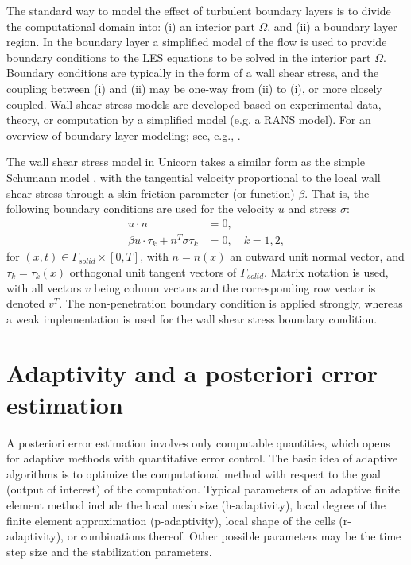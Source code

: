 The standard way to model the effect of turbulent boundary layers is to
divide the computational domain into: (i) an interior part $\Omega$, and
(ii) a boundary layer region. In the boundary layer a simplified model of
the flow is used to provide boundary conditions to the LES equations to be
solved in the interior part $\Omega$. Boundary conditions are typically in
the form of a wall shear stress, and the coupling between (i) and (ii) may
be one-way from (ii) to (i), or more closely coupled. Wall shear stress
models are developed based on experimental data, theory, or computation by
a simplified model (e.g. a RANS model). For an overview of boundary layer
modeling; see, e.g., \citet{SagautDeckTerracol2006,PiomelliBalaras2002}.

The wall shear stress model in Unicorn takes a similar form as the
simple Schumann model \citep{Schumann1975}, with the tangential velocity
proportional to the local wall shear stress through a skin friction
parameter (or function) $\beta$. That is, the following boundary
conditions are used for the velocity $u$ and stress $\sigma$:
\begin{align}
u\cdot n &= 0, \label{slfra} \\
\beta u\cdot \tau _k + n^T\sigma \tau _k &= 0, \quad k=1,2, \label{slfrb}
\end{align}
for  $(x,t)\in \Gamma_{solid}\times [0,T]$, with $n=n(x)$ an outward unit normal vector, and $\tau_k=\tau_k(x)$ orthogonal unit tangent vectors of $\Gamma_{solid}$. Matrix notation is used, with all vectors $v$ being column vectors and the corresponding row vector is denoted $v^T$. The non-penetration boundary condition is applied strongly, whereas a weak implementation is used for the wall shear stress boundary condition.

\section{Adaptivity and a posteriori error estimation}

A posteriori error estimation involves only computable quantities, which
opens for adaptive methods with quantitative error control. The basic
idea of adaptive algorithms is to optimize the computational method with
respect to the goal (output of interest) of the computation. Typical
parameters of an adaptive finite element method include the local mesh
size (h-adaptivity), local degree of the finite element approximation
(p-adaptivity), local shape of the cells (r-adaptivity), or combinations
thereof. Other possible parameters may be the time step size and the
stabilization parameters.


